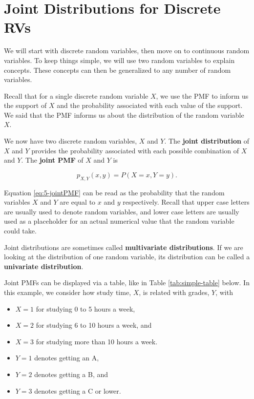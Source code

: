 \documentclass[
]{book}
\providecommand{\tightlist}{%
  \setlength{\itemsep}{0pt}\setlength{\parskip}{0pt}}
\begin{document}
\hypertarget{jointDis}{%
\section{Joint Distributions for Discrete RVs}\label{jointDis}}

We will start with discrete random variables, then move on to continuous random variables. To keep things simple, we will use two random variables to explain concepts. These concepts can then be generalized to any number of random variables.

Recall that for a single discrete random variable \(X\), we use the PMF to inform us the support of \(X\) and the probability associated with each value of the support. We said that the PMF informs us about the distribution of the random variable \(X\).

We now have two discrete random variables, \(X\) and \(Y\). The \textbf{joint distribution} of \(X\) and \(Y\) provides the probability associated with each possible combination of \(X\) and \(Y\). The \textbf{joint PMF} of \(X\) and \(Y\) is

\begin{equation} 
p_{X,Y}(x,y) = P(X=x, Y=y).
\label{eq:5-jointPMF}
\end{equation}

Equation \eqref{eq:5-jointPMF} can be read as the probability that the random variables \(X\) and \(Y\) are equal to \(x\) and \(y\) respectively. Recall that upper case letters are usually used to denote random variables, and lower case letters are usually used as a placeholder for an actual numerical value that the random variable could take.

Joint distributions are sometimes called \textbf{multivariate distributions}. If we are looking at the distribution of one random variable, its distribution can be called a \textbf{univariate distribution}.

Joint PMFs can be displayed via a table, like in Table \ref{tab:simple-table} below. In this example, we consider how study time, \(X\), is related with grades, \(Y\), with

\begin{itemize}
\tightlist
\item
  \(X=1\) for studying 0 to 5 hours a week,
\item
  \(X=2\) for studying 6 to 10 hours a week, and
\item
  \(X=3\) for studying more than 10 hours a week.
\item
  \(Y=1\) denotes getting an A,
\item
  \(Y=2\) denotes getting a B, and
\item
  \(Y=3\) denotes getting a C or lower.
\end{itemize}
\end{document}

